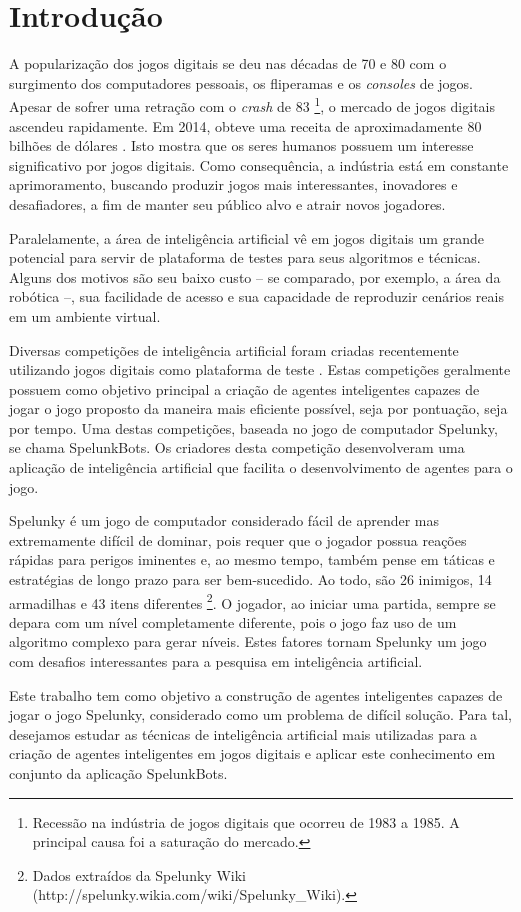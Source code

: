 \chapter{\label{chap:intro}Introdução}
A popularização dos jogos digitais se deu nas décadas de 70 e 80 com o
surgimento dos computadores pessoais, os fliperamas e os \textit{consoles} de
jogos. Apesar de sofrer uma retração com o \textit{crash} de 83
\footnote{Recessão na indústria de jogos digitais que ocorreu de 1983 a 1985. A
principal causa foi a saturação do mercado.}, o mercado de jogos digitais
ascendeu rapidamente. Em 2014, obteve uma receita de aproximadamente 80 bilhões
de dólares \cite{VIDEOGAMEREVENUE}. Isto mostra que os seres humanos possuem um
interesse significativo por jogos digitais. Como consequência, a indústria está
em constante aprimoramento, buscando produzir jogos mais interessantes,
inovadores e desafiadores, a fim de manter seu público alvo e atrair novos
jogadores.

Paralelamente, a área de inteligência artificial vê em jogos digitais um grande
potencial para servir de plataforma de testes para seus algoritmos e técnicas.
Alguns dos motivos são seu baixo custo -- se comparado, por exemplo, a área da
robótica --, sua facilidade de acesso e sua capacidade de reproduzir cenários
reais em um ambiente virtual.

Diversas competições de inteligência artificial foram criadas recentemente
utilizando jogos digitais como plataforma de teste \cite{GameAiCompetition}.
Estas competições geralmente possuem como objetivo principal a criação de
agentes inteligentes capazes de jogar o jogo proposto da maneira mais eficiente
possível, seja por pontuação, seja por tempo. Uma destas competições, baseada no
jogo de computador Spelunky, se chama SpelunkBots. Os criadores desta competição
desenvolveram uma aplicação de inteligência artificial que facilita o
desenvolvimento de agentes para o jogo.

Spelunky é um jogo de computador considerado fácil de aprender mas extremamente
difícil de dominar, pois requer que o jogador possua reações rápidas para
perigos iminentes e, ao mesmo tempo, também pense em táticas e estratégias de
longo prazo para ser bem-sucedido. Ao todo, são 26 inimigos, 14 armadilhas e 43
itens diferentes \footnote{Dados extraídos da Spelunky Wiki
(http://spelunky.wikia.com/wiki/Spelunky\_Wiki).}. O jogador, ao iniciar uma
partida, sempre se depara com um nível completamente diferente, pois o jogo faz
uso de um algoritmo complexo para gerar níveis. Estes fatores tornam Spelunky um
jogo com desafios interessantes para a pesquisa em inteligência artificial.

Este trabalho tem como objetivo a construção de agentes inteligentes capazes de
jogar o jogo Spelunky, considerado como um problema de difícil solução. Para
tal, desejamos estudar as técnicas de inteligência artificial mais utilizadas
para a criação de agentes inteligentes em jogos digitais e aplicar este
conhecimento em conjunto da aplicação SpelunkBots.

